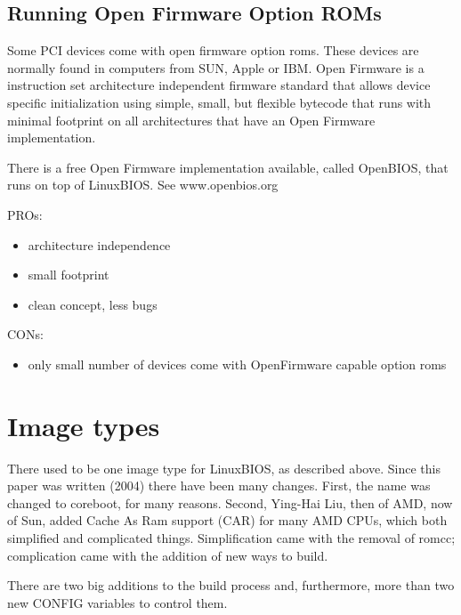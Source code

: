\documentclass[titlepage,12pt]{article}
\begin{document}
\subsection{Running Open Firmware Option ROMs}

Some PCI devices come with open firmware option roms. These devices are
normally found in computers from SUN, Apple or IBM. Open Firmware is a
instruction set architecture independent firmware standard that allows
device specific initialization using simple, small, but flexible
bytecode that runs with minimal footprint on all architectures that have
an Open Firmware implementation.

There is a free Open Firmware implementation available, called OpenBIOS,
that runs on top of LinuxBIOS. See www.openbios.org

PROs:
 \begin{itemize}
 \item architecture independence
 \item small footprint
 \item clean concept, less bugs
 \end{itemize}

CONs:
 \begin{itemize}
 \item only small number of devices come with OpenFirmware capable option roms
 \end{itemize}

%
%

\section{Image types}
There used to be one image type for LinuxBIOS, as described above. Since this paper was written (2004) there have been many changes. First, the name 
was changed to coreboot, for many reasons. Second, Ying-Hai Liu, then of AMD, now of Sun, added Cache As Ram support (CAR) for many AMD CPUs, which both simplified and complicated things. Simplification came with the removal of romcc; complication came with the addition of new ways to build. 

There are two big additions to the build process and, furthermore, more than two new CONFIG variables to control them. 
\end{document}
